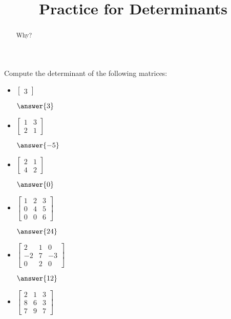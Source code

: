\documentclass{ximera}
\title{Practice for Determinants}
\begin{document}
\begin{abstract}
Why?
\end{abstract}
\maketitle



\begin{exercise}
    Compute the determinant of the following matrices:
    \begin{itemize}
        \item
        $\begin{bmatrix}
            3
        \end{bmatrix}$

        $\answer{3}$
        \item
        $\begin{bmatrix}
            1 & 3 \\
            2 & 1
        \end{bmatrix}$

        $\answer{-5}$
        \item
        $\begin{bmatrix}
            2 & 1 \\
            4 & 2
        \end{bmatrix}$

        $\answer{0}$
        \item
        $\begin{bmatrix}
            1 & 2 & 3 \\
            0 & 4 & 5 \\
            0 & 0 & 6
        \end{bmatrix}$

        $\answer{24}$
        \item
        $\begin{bmatrix}
            2 & 1 & 0 \\
            -2 & 7 & -3 \\
            0 & 2 & 0
        \end{bmatrix}$

        $\answer{12}$
        \item
        $\begin{bmatrix}
            2 & 1 & 3 \\
            8 & 6 & 3 \\
            7 & 9 & 7
        \end{bmatrix}$


\end{itemize}
\end{exercise}
\end{document}
